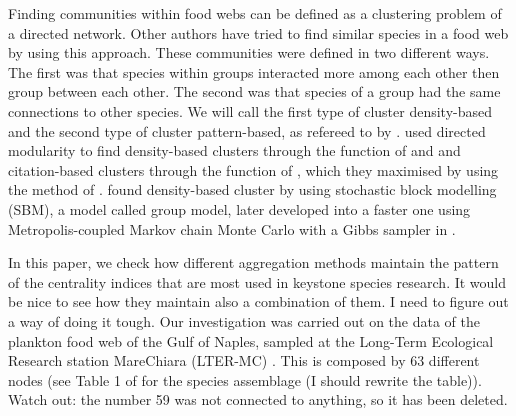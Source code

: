     \par Finding communities within food webs can be defined as a clustering problem of a directed network. Other authors have tried to find similar species in a food web by using this approach. These communities were defined in two different ways. The first was that species within groups interacted more among each other then group between each other. The second was that species of a group had the same connections to other species. We will call the first type of cluster density-based and the second type of cluster pattern-based, as refereed to by \citet{Malliaros2013}.  \citet{Guimera2010} used directed modularity to find density-based clusters through the function of \citet{Arenas2007} and \citet{Leicht2008} and citation-based clusters through the function of \citet{Guimera2007}, which they maximised by using the method of \citet{Newman2004}. \citet{Allesina2009a} found density-based cluster by using stochastic block modelling (SBM), a model called group model, later developed into a faster one using Metropolis-coupled Markov chain Monte Carlo with a Gibbs sampler in \citet{Sander2015}. 
    \par In this paper, we check how different aggregation methods maintain the pattern of the centrality indices that are most used in keystone species research. {\color{red}It would be nice to see how they maintain also a combination of them. I need to figure out a way of doing it tough.} Our investigation was carried out on the data of the plankton food web of the Gulf of Naples, sampled at the Long-Term Ecological Research station MareChiara (LTER-MC) \citep{RiberadAlcala2004}. This is composed by 63 different nodes (see Table 1 of \citep{DAlelio2016} for the species assemblage {\color{red} (I should rewrite the table)}). Watch out: the number 59 was not connected to anything, so it has been deleted. 